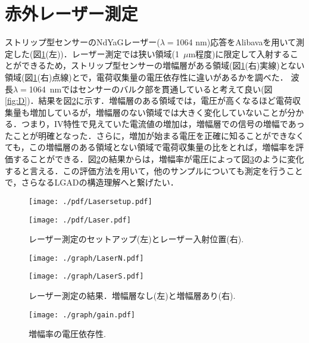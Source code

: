 \section{赤外レーザー測定}
\label{sub:Laser}
ストリップ型センサーのNdYaGレーザー($\lambda=$1064 nm)応答をAlibavaを用いて測定した(図\ref{fig:Lasersetup}(左))．レーザー測定では狭い領域(1~$\mu$m程度)に限定して入射することができるため，ストリップ型センサーの増幅層がある領域(図\ref{fig:Lasersetup}(右)実線)とない領域(図\ref{fig:Lasersetup}(右)点線)とで，電荷収集量の電圧依存性に違いがあるかを調べた． 波長$\lambda=$1064~nmではセンサーのバルク部を貫通していると考えて良い(図\ref{fig:D})．結果を図\ref{fig:Laser}に示す．増幅層のある領域では，電圧が高くなるほど電荷収集量も増加しているが，増幅層のない領域では大きく変化していないことが分かる．つまり，IV特性で見えていた電流値の増加は，増幅層での信号の増幅であったことが明確となった．さらに，増加が始まる電圧を正確に知ることができなくても，この増幅層のある領域とない領域で電荷収集量の比をとれば，増幅率を評価することができる．図\ref{fig:Laser}の結果からは，増幅率が電圧によって図\ref{fig:gain}のように変化すると言える．この評価方法を用いて，他のサンプルについても測定を行うことで，さらなるLGADの構造理解へと繋げたい．\par
\begin{figure}[H]
\begin{minipage}[b]{0.6\hsize}
	\centering
	\texttt{[image: ./pdf/Lasersetup.pdf]}
\end{minipage}
\begin{minipage}[b]{0.3\hsize}
	\centering
	\texttt{[image: ./pdf/Laser.pdf]}
\end{minipage}
 	\caption{レーザー測定のセットアップ(左)とレーザー入射位置(右).}
	\label{fig:Lasersetup}
\end{figure}
\begin{figure}[H]
\begin{minipage}{0.5\hsize}
	\centering
	\texttt{[image: ./graph/LaserN.pdf]}
\end{minipage}
\begin{minipage}{0.5\hsize}
	\centering
	\texttt{[image: ./graph/LaserS.pdf]}
\end{minipage}
 	\caption{レーザー測定の結果．増幅層なし(左)と増幅層あり(右).}
	\label{fig:Laser}
\end{figure}
\begin{figure}[H]
	\centering
	\texttt{[image: ./graph/gain.pdf]}
 	\caption{増幅率の電圧依存性.}
	\label{fig:gain}
\end{figure}